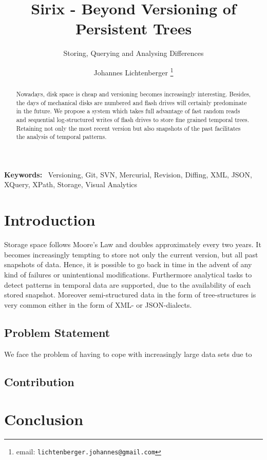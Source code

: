 \documentclass[10pt,twoside,a4paper,twocolumn,abstracton]{scrartcl}
\newenvironment{keywords}%
   {\begin{trivlist}\item[]{\bfseries\sffamily Keywords:}\ }
   {\end{trivlist}}
\begin{document}
\title{Sirix - Beyond Versioning of Persistent Trees}
\subtitle{Storing, Querying and Analysing Differences}
\author{Johannes Lichtenberger \thanks{email: \texttt{lichtenberger.johannes@gmail.com}}}

\maketitle

\begin{abstract}
Nowadays, disk space is cheap and versioning becomes increasingly interesting. Besides, the days of mechanical disks are numbered and flash drives will certainly predominate in the future. We propose a system which takes full advantage of fast random reads and sequential log-structured writes of flash drives to store fine grained temporal trees. Retaining not only the most recent version but also snapshots of the past facilitates the analysis of temporal patterns.
\end{abstract}

\begin{keywords}
Versioning, Git, SVN, Mercurial, Revision, Diffing, XML, JSON, XQuery, XPath, Storage, Visual Analytics
\end{keywords}

\section{Introduction}
Storage space follows Moore's Law and doubles approximately every two years. It becomes increasingly tempting to store not only the current version, but all past snapshots of data. Hence, it is possible to go back in time in the advent of any kind of failures or unintentional modifications. Furthermore analytical tasks to detect patterns in temporal data are supported, due to the availability of each stored snapshot. Moreover semi-structured data in the form of tree-structures is very common either in the form of XML- or JSON-dialects.

\subsection{Problem Statement}
We face the problem of having to cope with increasingly large data sets due to
\subsection{Contribution}

\section{Conclusion}
\end{document}
